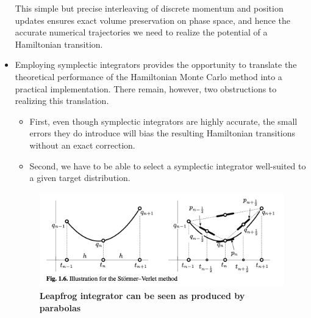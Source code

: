 \documentclass[11pt]{article}
\begin{document}
\begin{itemize}
This simple but precise interleaving of discrete momentum and position updates ensures exact volume preservation on phase space, and hence the accurate numerical trajectories we need to realize the potential of a Hamiltonian transition.


\item Employing symplectic integrators provides the opportunity to translate the theoretical performance of the Hamiltonian Monte Carlo method into a practical implementation. There remain, however, two obstructions to realizing this translation. 
\begin{itemize}
\item First, even though symplectic integrators are highly accurate, the small errors they do introduce will bias the resulting Hamiltonian transitions without an exact correction. 
\item Second, we have to be able to select a symplectic integrator well-suited to a given target distribution.
\end{itemize}

\begin{figure}
\begin{minipage}[t]{1\linewidth}
  \centering
  \centerline{\includegraphics[scale = 0.5]{leapfrog.png}}
\end{minipage}
\caption{\footnotesize{\textbf{Leapfrog integrator can be seen as produced by parabolas \citep{haier2006geometric}}}}
\label{fig: leapfrog}
\end{figure}


\end{itemize}
\end{document}
